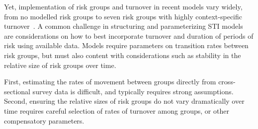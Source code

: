 Yet, implementation of risk groups and turnover in recent models vary widely,
from no modelled risk groups to
seven risk groups with highly context-specific turnover~\citep{Boily2015}.
A common challenge in structuring and parameterizing STI models
are considerations on how to best incorporate
turnover and duration of periods of risk
using available data.
Models require parameters on transition rates between risk groups,
but must also content with considerations such as
stability in the relative size of risk groups over time.
\par
First, estimating the rates of movement between groups
directly from cross-sectional survey data is difficult,
and typically requires strong assumptions.
Second, ensuring the relative sizes of risk groups
do not vary dramatically over time requires
careful selection of rates of turnover among groups,
or other compensatory parameters.
\par
\par
%
%
